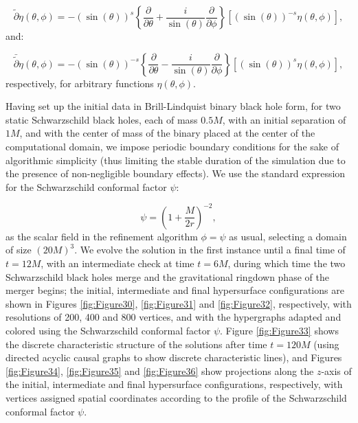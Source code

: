 \documentclass{article}
\begin{document}
\begin{equation}
\tilde{\partial} \eta \left( \theta, \phi \right) = - \left( \sin \left( \theta \right) \right)^s \left\lbrace \frac{\partial}{\partial \theta} + \frac{i}{\sin \left( \theta \right)} \frac{\partial}{\partial \phi} \right\rbrace \left[ \left( \sin \left( \theta \right) \right)^{-s} \eta \left( \theta, \phi \right) \right],
\end{equation}
and:

\begin{equation}
\bar{\tilde{\partial}} \eta \left( \theta, \phi \right) = - \left( \sin \left( \theta \right) \right)^{-s} \left\lbrace \frac{\partial}{\partial \theta} - \frac{i}{\sin \left( \theta \right)} \frac{\partial}{\partial \phi} \right\rbrace \left[ \left( \sin \left( \theta \right) \right)^s \eta \left( \theta, \phi \right) \right],
\end{equation}
respectively, for arbitrary functions ${\eta \left( \theta, \phi \right)}$.

Having set up the initial data in Brill-Lindquist binary black hole form, for two static Schwarzschild black holes, each of mass ${0.5 M}$, with an initial separation of ${1 M}$, and with the center of mass of the binary placed at the center of the computational domain, we impose periodic boundary conditions for the sake of algorithmic simplicity (thus limiting the stable duration of the simulation due to the presence of non-negligible boundary effects). We use the standard expression for the Schwarzschild conformal factor ${\psi}$:

\begin{equation}
\psi = \left( 1 + \frac{M}{2r} \right)^{-2},
\end{equation}
as the scalar field in the refinement algorithm ${\phi = \psi}$ as usual, selecting a domain of size ${\left( 20 M \right)^3}$. We evolve the solution in the first instance until a final time of ${t = 12 M}$, with an intermediate check at time ${t = 6 M}$, during which time the two Schwarzschild black holes merge and the gravitational ringdown phase of the merger begins; the initial, intermediate and final hypersurface configurations are shown in Figures \ref{fig:Figure30}, \ref{fig:Figure31} and \ref{fig:Figure32}, respectively, with resolutions of 200, 400 and 800 vertices, and with the hypergraphs adapted and colored using the Schwarzschild conformal factor ${\psi}$. Figure \ref{fig:Figure33} shows the discrete characteristic structure of the solutions after time ${t = 120 M}$ (using directed acyclic causal graphs to show discrete characteristic lines), and Figures \ref{fig:Figure34}, \ref{fig:Figure35} and \ref{fig:Figure36} show projections along the $z$-axis of the initial, intermediate and final hypersurface configurations, respectively, with vertices assigned spatial coordinates according to the profile of the Schwarzschild conformal factor ${\psi}$.
\end{document}
